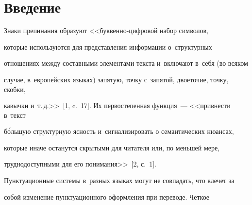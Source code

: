   

















 \thispagestyle{headings}


 


 \vspace*{-14pt}





\section{Введение}





  Знаки препинания образуют <<бук\-вен\-но-циф\-ро\-вой набор символов, 


которые используются для представления информации о~структурных 


отношениях между составными элементами текста и~включают в~себя (во всяком 


случае, в~европейских языках) запятую, точку с~запятой, двоеточие, точку, скобки, 


кавычки и~т.\,д.>>~[1, c.~17]. Их первостепенная функция~--- <<привнести в~текст 


б\'{о}льшую структурную ясность и~сигнализировать о семантических нюансах, 


которые иначе останутся скрытыми для читателя или, по меньшей мере, 


труднодоступными для его понимания>>~[2, с.~1].


  


  Пунктуационные системы в~разных языках могут не совпадать, что влечет за 


собой изменение пунктуационного оформления при переводе. Четкое 


